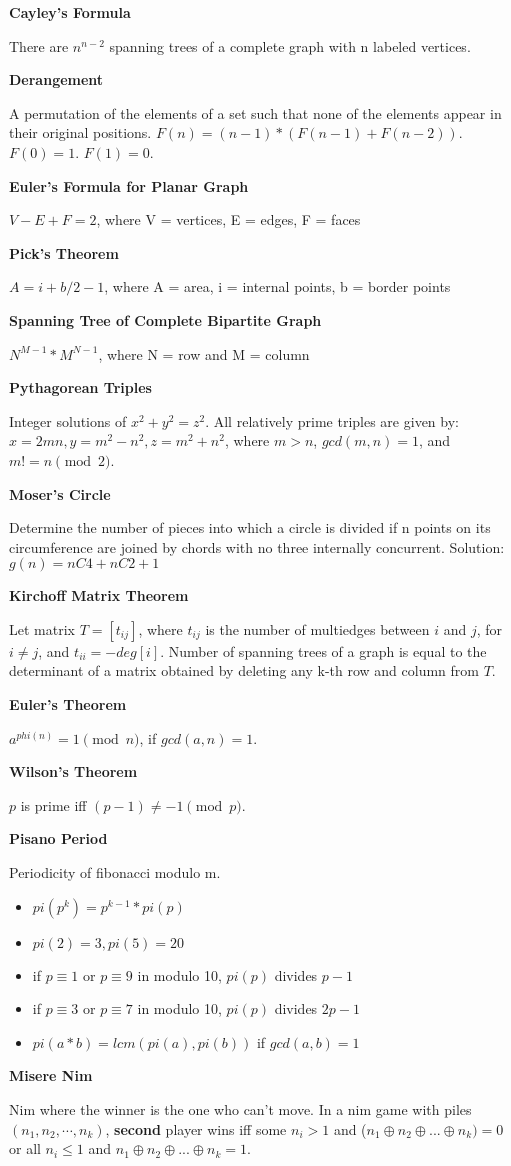 
\textbf{Cayley's Formula}

There are $n^{n-2}$ spanning trees of a complete graph with n labeled vertices.

\bigbreak
\textbf{Derangement}

A permutation of the elements of a set such that none of the elements appear in their original positions. $F(n) = (n-1) * (F(n-1) + F(n-2))$. $F(0) = 1$. $F(1) = 0$.

\bigbreak
\textbf{Euler’s Formula for Planar Graph}

$V - E + F = 2$, where V = vertices, E = edges, F = faces

\bigbreak
\textbf{Pick’s Theorem}

$A = i + b/2 - 1$, where A = area, i = internal points, b = border points

\bigbreak
\textbf{Spanning Tree of Complete Bipartite Graph}

$N^{M-1} * M^{N-1}$, where N = row and M = column

\bigbreak
\textbf{Pythagorean Triples}

Integer solutions of $x^2 + y^2 = z^2$. All relatively prime triples are given by: $x = 2mn, y = m^2 - n^2, z = m^2 + n^2$, where $m > n$, $gcd(m, n) = 1$, and $m != n \pmod{2}$.

\bigbreak
\textbf{Moser’s Circle}

Determine the number of pieces into which a circle is divided if n points on its circumference are joined by chords with no three internally concurrent. Solution: $g(n) = nC4 + nC2 + 1$

\bigbreak
\textbf{Kirchoff Matrix Theorem}

Let matrix $T = [t_{ij}]$, where $t_{ij}$ is the number of multiedges between $i$ and $j$, for $i \neq j$, and $t_{ii} = -deg[i]$. Number of spanning trees of a graph is equal to the determinant of a matrix obtained by deleting any k-th row and column from $T$.

\bigbreak
\textbf{Euler's Theorem}

$a^{phi(n)} = 1 \pmod{n}$, if $gcd(a, n) = 1$. 

\bigbreak
\textbf{Wilson's Theorem} 

$p$ is prime iff $(p-1) \neq -1 \pmod{p}$.

\bigbreak
\textbf{Pisano Period}

Periodicity of fibonacci modulo m.

\begin{itemize}
    \item $pi(p^{k}) = p^{k-1} * pi(p)$
    \item $pi(2) = 3, pi(5) = 20$
    \item if $p \equiv 1$ or $p \equiv 9$ in modulo 10, $pi(p)$ divides $p-1$
    \item if $p \equiv 3$ or $p \equiv 7$ in modulo 10, $pi(p)$ divides $2p-1$
    \item $pi(a * b) = lcm(pi(a), pi(b))$ if $gcd(a, b) = 1$
\end{itemize}

\bigbreak
\textbf{Misere Nim}

Nim where the winner is the one who can't move. In a nim game with piles $(n_1, n_2, \cdots, n_k)$, \textbf{second} player wins iff some $n_i > 1$ and ($n_1 \oplus n_2 \oplus ... \oplus n_k) = 0$ or all $n_i \leq 1$ and $n_1 \oplus n_2 \oplus ... \oplus n_k = 1$.